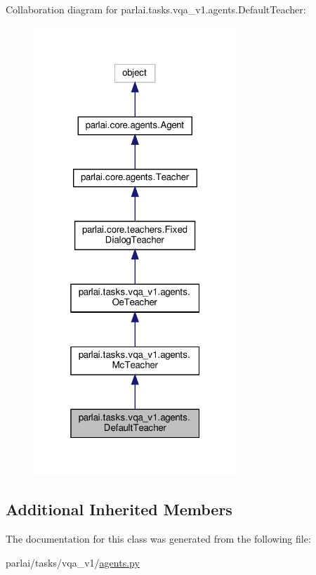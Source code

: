Collaboration diagram for parlai.\+tasks.\+vqa\+\_\+v1.\+agents.\+Default\+Teacher\+:
\nopagebreak
\begin{figure}[H]
\begin{center}
\leavevmode
\includegraphics[width=217pt]{classparlai_1_1tasks_1_1vqa__v1_1_1agents_1_1DefaultTeacher__coll__graph}
\end{center}
\end{figure}
\subsection*{Additional Inherited Members}


The documentation for this class was generated from the following file\+:\begin{DoxyCompactItemize}
\item 
parlai/tasks/vqa\+\_\+v1/\hyperlink{parlai_2tasks_2vqa__v1_2agents_8py}{agents.\+py}\end{DoxyCompactItemize}
